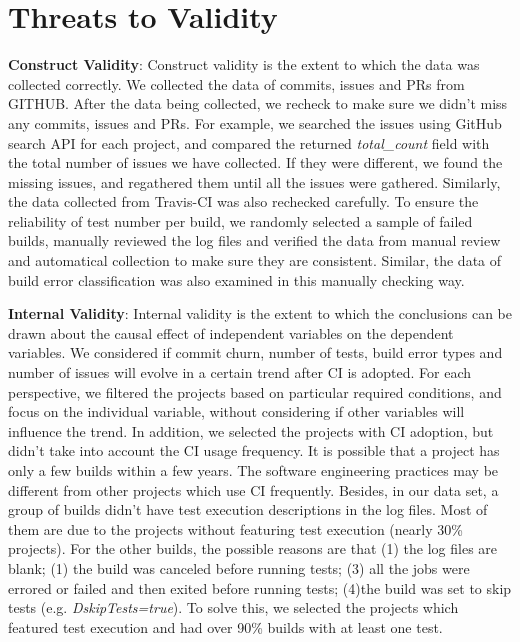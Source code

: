 
\section{Threats to Validity}
\label{sec:threats}
\textbf{Construct Validity}: 
Construct validity is the extent to which the data was collected correctly. We collected the data of commits, issues and PRs from GITHUB. After the data being collected, we recheck to make sure we didn’t miss any commits, issues and PRs. For example, we searched the issues using GitHub search API for each project, and compared the returned \textit{total\_count} field with the total number of issues we have collected. If they were different, we found the missing issues, and regathered them until all the issues were gathered. Similarly, the data collected from Travis-CI was also rechecked carefully. To ensure the reliability of test number per build, we randomly selected a sample of failed builds, manually reviewed the log files and verified the data from manual review and automatical collection to make sure they are consistent. Similar, the data of build error classification was also examined in this manually checking way.

\textbf{Internal Validity}:
Internal validity is the extent to which the conclusions can be drawn about the causal effect of independent variables on the dependent variables. We considered if commit churn, number of tests, build error types and number of issues will evolve in a certain trend after CI is adopted. For each perspective, we filtered the projects based on particular required conditions, and focus on the individual variable, without considering if other variables will influence the trend. 
In addition, we selected the projects with CI adoption, but didn’t take into account the CI usage frequency. It is possible that a project has only a few builds within a few years. The software engineering practices may be different from other projects which use CI frequently. 
Besides, in our data set, a group of builds didn’t have test execution descriptions in the log files. Most of them are due to the projects without featuring test execution (nearly 30\% projects). For the other builds, the possible reasons are that (1) the log files are blank; (1) the build was canceled before running tests; (3) all the jobs were errored or failed and then exited before running tests; (4)the build was set to skip tests (e.g. \textit{DskipTests=true}). To solve this, we selected the projects which featured test execution and had over 90\% builds with at least one test.


